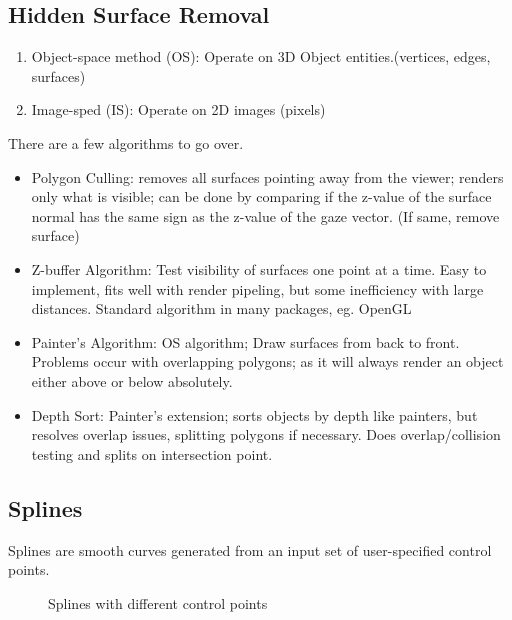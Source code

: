 \subsection{Hidden Surface Removal}
\begin{enumerate}
	\item Object-space method (OS): Operate on 3D Object entities.(vertices, edges, surfaces)
	\item Image-sped (IS): Operate on 2D images (pixels)
\end{enumerate}
There are a few algorithms to go over.
\begin{itemize}
	\item Polygon Culling: removes all surfaces pointing away from the viewer; renders only what is visible; can be done by comparing if the z-value of the surface normal has the same sign as the z-value of the gaze vector. (If same, remove surface)
	\item Z-buffer Algorithm: Test visibility of surfaces one point at a time. Easy to implement, fits well with render pipeling, but some inefficiency with large distances. Standard algorithm in many packages, eg. OpenGL
	\item Painter's Algorithm: OS algorithm; Draw surfaces from back to front. Problems occur with overlapping polygons; as it will always render an object either above or below absolutely.
	\item Depth Sort: Painter's extension; sorts objects by depth like painters, but resolves overlap issues, splitting polygons if necessary. Does overlap/collision testing and splits on intersection point.
\end{itemize}
\newpage
\subsection{Splines}
Splines are smooth curves generated from an input set of user-specified control points.
\begin{figure}[!htb]
	\caption{\label{fig:spline}Splines with different control points}
\end{figure}

